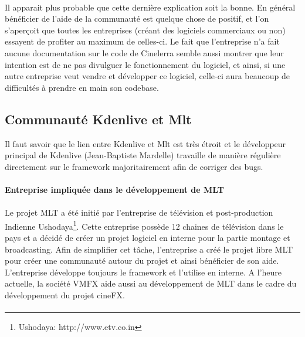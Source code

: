 \paragraph{}

Il apparait plus probable que cette dernière explication soit la bonne.
En général bénéficier de l'aide de la communauté est quelque chose
de positif, et l'on s'aperçoit que toutes les entreprises (créant
des logiciels commerciaux ou non) essayent de profiter au maximum de
celles-ci. Le fait que l'entreprise n'a fait aucune documentation sur
le code de Cinelerra semble aussi montrer que leur intention est de
ne pas divulguer le fonctionnement du logiciel, et ainsi, si une autre
entreprise veut vendre et développer ce logiciel, celle-ci aura beaucoup
de difficultés à prendre en main son codebase.

\subsection {Communauté Kdenlive et Mlt}

Il faut savoir que le lien entre Kdenlive et Mlt est très étroit et le
développeur principal de Kdenlive (Jean-Baptiste Mardelle) travaille
de manière régulière directement sur le framework majoritairement
afin de corriger des bugs.

\paragraph{Entreprise impliquée dans le développement de MLT}

\paragraph{}

Le projet MLT a été initié par l'entreprise de
télévision et post-production Indienne Ushodaya\footnote{Ushodaya:
http://www.etv.co.in}. Cette entreprise possède 12 chaines de
télévision dans le pays et a décidé de créer un projet logiciel
en interne pour la partie montage et broadcasting. Afin de simplifier
cet tâche, l'entreprise a créé le projet libre MLT pour
créer une communauté autour du projet et ainsi bénéficier de son
aide. L'entreprise développe toujours le framework et l'utilise
en interne. A l'heure actuelle, la société VMFX aide aussi au
développement de MLT dans le cadre du développement du projet cineFX.

\paragraph{}


